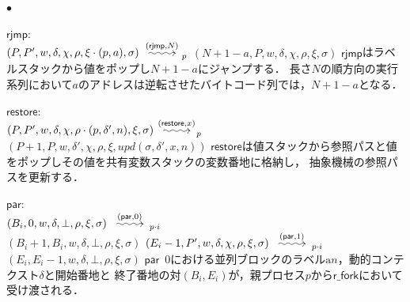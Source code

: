 \documentclass[submit,PRO]{ipsj}
\makeatletter
\newcommand{\longsquiggly}{\xymatrix{{}\ar@{~>}[r]&{}}}
\newcommand{\bcode}[1]{$\mathsf{#1}$}
\newcommand{\brightarrow}[1]{\stackrel{#1}{\longsquiggly}}
\newcommand{\alabel}[1]{\mathrm{a}#1}
\makeatother
\begin{document}
\begin{list}%
 {$\bullet$} %
 {} %
 \item \bcode{rjmp}:\\
$(P,P',w,\delta,\chi,\rho,\xi\cdot(p,a),\sigma)\brightarrow{(\mathsf{rjmp},N)}_p$\newline
\qquad$(N+1-a,P,w,\delta,\chi,\rho,\xi,\sigma)$\newline
\bcode{rjmp}はラベルスタックから値をポップし$N+1-a$にジャンプする．
長さ$N$の順方向の実行系列において$a$のアドレスは逆転させたバイトコード列では，$N+1-a$となる．
\item \bcode{restore}:\\
$(P,P',w,\delta,\chi,\rho\cdot(p,\delta',n),\xi,\sigma)\brightarrow{(\mathsf{restore},x)}_p$\newline
\qquad$(P+1,P,w,\delta',\chi,\rho,\xi,upd(\sigma,\delta',x,n))$\newline
\bcode{restore}は値スタックから参照パスと値をポップしその値を共有変数スタックの変数番地に格納し，
抽象機械の参照パスを更新する．
\item \bcode{par}:\\
$(B_i,0,w,\delta,\bot,\rho,\xi,\sigma)\brightarrow{(\mathsf{par},0)}_{p\cdot i}$\\
\hspace*{.25\linewidth}$(B_i+1,B_i,w,\delta,\bot,\rho,\xi,\sigma)$\newline
$(E_i-1,P',w,\delta,\chi,\rho,\xi,\sigma)\brightarrow{(\mathsf{par},1)}_{p\cdot i}$\\
\hspace*{.25\linewidth}$(E_i,E_i-1,w,\delta,\bot,\rho,\xi,\sigma)$\newline
\bcode{par}\ 0における並列ブロックのラベル$\alabel{n}$，動的コンテクスト$\delta$と開始番地と
終了番地の対$(B_i,E_i)$が，親プロセス$p$から\bcode{r\_fork}において受け渡される．

\end{list}
\end{document}
